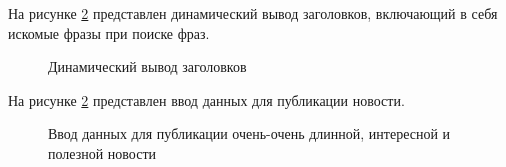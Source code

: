 На рисунке \ref{usecase:image} представлен динамический вывод заголовков, включающий в себя искомые фразы при поиске фраз.

\begin{figure}[ht]
\caption{Динамический вывод заголовков}
\label{usecase:image}
\end{figure}

На рисунке \ref{usecase:image} представлен ввод данных для публикации новости.

\begin{figure}[ht]
\caption{Ввод данных для публикации очень-очень длинной, интересной и полезной новости}
\label{usecase:image}
\end{figure}

